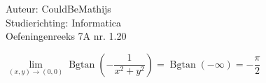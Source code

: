 \documentclass[a4paper]{article}
\newcommand{\llim}{\lim\limits}
\newcommand{\Bgtan}{\operatorname{Bgtan}}
\begin{document}
  
\noindent \large Auteur: CouldBeMathijs \\
\noindent \large Studierichting: Informatica\\
\noindent \large Oefeningenreeks 7A nr. 1.20\\

\medskip

\normalsize

$ \llim_{(x,y) \rightarrow (0,0)} \Bgtan \left( - \dfrac{1}{x^2+y^2}\right) = \Bgtan(-\infty) = - \dfrac{\pi}{2}$

\begin{thebibliography}{999}
\end{thebibliography}
\end{document}
